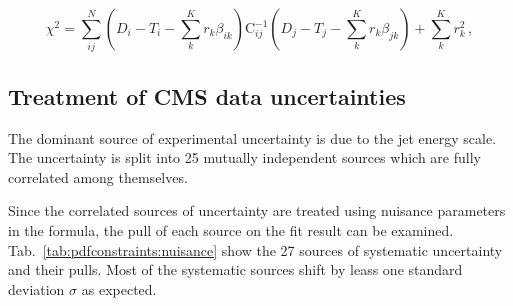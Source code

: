 \begin{equation}
  \chi^2 = \sum_{ij}^N \left(D_i - T_i - \sum_k^K r_k \beta_{ik}\right) \mathrm{C}_{ij}^{-1}
  \left(D_j - T_j - \sum_k^K r_k \beta_{jk} \right) + \sum_k^K r_k^2\,,
  \label{chi2_nuisance}
\end{equation}


\subsection{Treatment of CMS data uncertainties}
\label{section:cmsdatauncertainties}

The dominant source of experimental uncertainty is due to the jet energy scale.
The uncertainty is split into 25 mutually independent sources which are fully
correlated among themselves. 

Since the correlated sources of uncertainty are treated using nuisance
parameters in the \chisq formula, the pull of each source on the fit result can
be examined. Tab.~\ref{tab:pdfconstraints:nuisance} show the 27 sources of
systematic uncertainty and their pulls. Most of the systematic sources shift by
leass one standard deviation $\sigma$ as expected.

